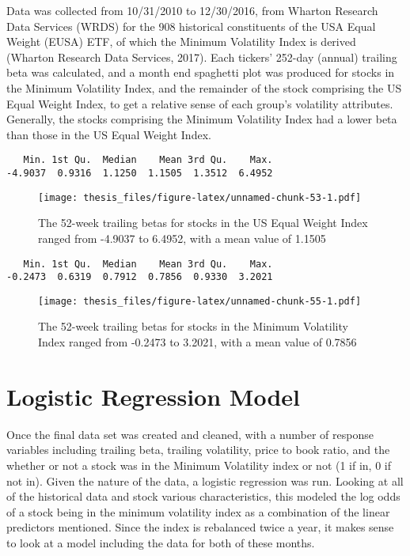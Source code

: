 \documentclass[12pt,twoside]{reedthesis}
\theoremstyle{definition}
\theoremstyle{definition}
\theoremstyle{definition}
\theoremstyle{remark}
\begin{document}
Data was collected from 10/31/2010 to 12/30/2016, from Wharton Research
Data Services (WRDS) for the 908 historical constituents of the USA
Equal Weight (EUSA) ETF, of which the Minimum Volatility Index is
derived (Wharton Research Data Services, 2017). Each tickers' 252-day
(annual) trailing beta was calculated, and a month end spaghetti plot
was produced for stocks in the Minimum Volatility Index, and the
remainder of the stock comprising the US Equal Weight Index, to get a
relative sense of each group's volatility attributes. Generally, the
stocks comprising the Minimum Volatility Index had a lower beta than
those in the US Equal Weight Index.
\begin{verbatim}
   Min. 1st Qu.  Median    Mean 3rd Qu.    Max. 
-4.9037  0.9316  1.1250  1.1505  1.3512  6.4952 
\end{verbatim}
\begin{figure}[htbp]
\centering
\texttt{[image: thesis\_files/figure-latex/unnamed-chunk-53-1.pdf]}
\caption{\label{fig:unnamed-chunk-53}The 52-week trailing betas for stocks
in the US Equal Weight Index ranged from -4.9037 to 6.4952, with a mean
value of 1.1505}
\end{figure}
\begin{verbatim}
   Min. 1st Qu.  Median    Mean 3rd Qu.    Max. 
-0.2473  0.6319  0.7912  0.7856  0.9330  3.2021 
\end{verbatim}
\begin{figure}[htbp]
\centering
\texttt{[image: thesis\_files/figure-latex/unnamed-chunk-55-1.pdf]}
\caption{\label{fig:unnamed-chunk-55}The 52-week trailing betas for stocks
in the Minimum Volatility Index ranged from -0.2473 to 3.2021, with a
mean value of 0.7856}
\end{figure}
\chapter{Logistic Regression Model}\label{logistic-regression-model}

Once the final data set was created and cleaned, with a number of
response variables including trailing beta, trailing volatility, price
to book ratio, and the whether or not a stock was in the Minimum
Volatility index or not (1 if in, 0 if not in). Given the nature of the
data, a logistic regression was run. Looking at all of the historical
data and stock various characteristics, this modeled the log odds of a
stock being in the minimum volatility index as a combination of the
linear predictors mentioned. Since the index is rebalanced twice a year,
it makes sense to look at a model including the data for both of these
months.
\end{document}

